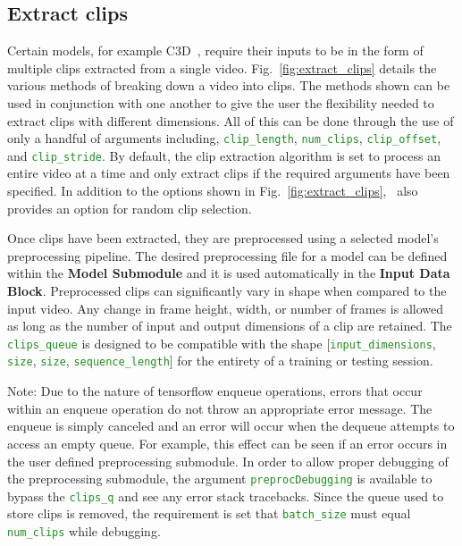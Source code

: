 \documentclass{llncs}
\begin{document}
\subsection{Extract clips}
\label{sec:extractclips}
Certain models, for example C3D~\cite{6165309}, require their inputs to be in the form of multiple clips extracted from a single video.
Fig.~\ref{fig:extract_clips} details the various methods of breaking down a video into clips.
The methods shown can be used in conjunction with one another to give the user the flexibility needed to extract clips with different dimensions.
All of this can be done through the use of only a handful of arguments including, \texttt{\textcolor{ForestGreen}{clip\_length}}, \texttt{\textcolor{ForestGreen}{num\_clips}}, \texttt{\textcolor{ForestGreen}{clip\_offset}}, and \texttt{\textcolor{ForestGreen}{clip\_stride}}.
By default, the clip extraction algorithm is set to process an entire video at a time and only extract clips if the required arguments have been specified.
In addition to the options shown in Fig.~\ref{fig:extract_clips}, \acro~also provides an option for random clip selection.

Once clips have been extracted, they are preprocessed using a selected model's preprocessing pipeline.
The desired preprocessing file for a model can be defined within the \textbf{Model Submodule} and it is used automatically in the \textbf{Input Data Block}.
Preprocessed clips can significantly vary in shape when compared to the input video.
Any change in frame height, width, or number of frames is allowed as long as the number of input and output dimensions of a clip are retained.
The \texttt{\textcolor{ForestGreen}{clips\_queue}} is designed to be compatible with the shape [\texttt{\textcolor{ForestGreen}{input\_dimensions}}, \texttt{\textcolor{ForestGreen}{size}}, \texttt{\textcolor{ForestGreen}{size}}, \texttt{\textcolor{ForestGreen}{sequence\_length}}] for the entirety of a training or testing session.

Note: Due to the nature of tensorflow enqueue operations, errors that occur within an enqueue operation do not throw an appropriate error message.
The enqueue is simply canceled and an error will occur when the dequeue attempts to access an empty queue.
For example, this effect can be seen if an error occurs in the user defined preprocessing submodule.
In order to allow proper debugging of the preprocessing submodule, the argument \texttt{\textcolor{ForestGreen}{preprocDebugging}} is available to bypass the \texttt{\textcolor{ForestGreen}{clips\_q}} and see any error stack tracebacks.
Since the queue used to store clips is removed, the requirement is set that \texttt{\textcolor{ForestGreen}{batch\_size}} must equal \texttt{\textcolor{ForestGreen}{num\_clips}} while debugging.
\end{document}
